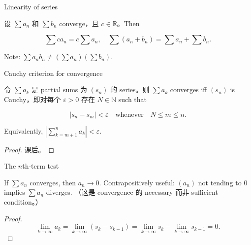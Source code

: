 \begin{theorem}{Linearity of series}

设 \(\sum a_{n}\) 和 \(\sum b_{n}\) converge，且 \(c \in \mathbb{R}\)。Then

\[\sum ca_{n} = c\sum a_{n},\quad\sum\left( {a_{n} + b_{n}} \right) = \sum a_{n} + \sum b_{n}.\]

Note: \(\sum a_{n}b_{n} \neq \left( {\sum a_{n}} \right)\left( {\sum b_{n}} \right)\).

\end{theorem}

\begin{theorem}{Cauchy criterion for convergence}

令 \(\sum a_{k}\) 是 partial sums 为 \(\left( s_{n} \right)\) 的 series。则 \(\sum a_{k}\) converges iff \(\left( s_{n} \right)\) is Cauchy，即对每个 \(\varepsilon > 0\) 存在 \(N \in \mathbb{N}\) such that

\[\left| {s_{n} - s_{m}} \right| < \varepsilon\quad\text{whenever}\quad N \leq m \leq n.\]

Equivalently, \(\left| {\sum_{k = m + 1}^{n}a_{k}} \right| < \varepsilon\).

\end{theorem}

\begin{proof}

课后。

\end{proof}

\begin{theorem}{The \(n\)th-term test}

If \(\sum a_{n}\) converges, then \(a_{n}\rightarrow 0\). Contrapositively useful: \(\left( a_{n} \right)\) not tending to \(0\) implies \(\sum a_{n}\) diverges. （这是 convergence 的 necessary 而非 sufficient condition。）

\end{theorem}

\begin{proof}

\[\lim\limits_{k\rightarrow\infty}a_{k} = \lim\limits_{k\rightarrow\infty}\left( {s_{k} - s_{k - 1}} \right) = \lim\limits_{k\rightarrow\infty}s_{k} - \lim\limits_{k\rightarrow\infty}s_{k - 1} = 0.\]

\end{proof}

